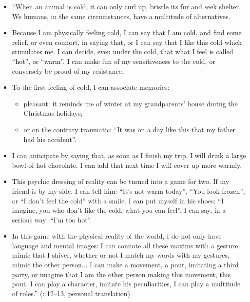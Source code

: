 \documentclass[output=paper]{langscibook}
\begin{document}
\begin{itemize}
\item “When an animal is cold, it can only curl up, bristle its fur and seek shelter. We humans, in the same circumstances, have a multitude of alternatives.
\item Because I am physically feeling cold, I can say that I am cold, and find some relief, or even comfort, in saying that, or I can say that I like this cold which stimulates me. I can decide, even under the cold, that what I feel is called “hot”, or “warm”. I can make fun of my sensitiveness to the cold, or conversely be proud of my resistance.
\item To the first feeling of cold, I can associate memories:

\begin{itemize}
\item pleasant: it reminds me of winter at my grandparents' house during the Christmas holidays;
\item or on the contrary traumatic: “It was on a day like this that my father had his accident”.
\end{itemize}

\item I can anticipate by saying that, as soon as I finish my trip, I will drink a large bowl of hot chocolate. I can add that next time I will cover up more warmly. 

\item This psychic dressing of reality can be turned into a game for two. If my friend is by my side, I can tell him: “It's not warm today”, “You look frozen”, or “I don't feel the cold” with a smile. I can put myself in his shoes: “I imagine, you who don't like the cold, what you can feel”. I can say, in a serious way: “I'm too hot”.

\item In this game with the physical reality of the world, I do not only have language and mental images: I can connote all these maxims with a gesture, mimic that I shiver, whether or not I match my words with my gestures, mimic the other person... I can make a movement, a pout, imitating a third party, or imagine that I am the other person making this movement, this pout. I can play a character, imitate his peculiarities, I can play a multitude of roles.” (\citealt{Jouvent2013}: 12--13, personal translation)
\end{itemize}
\end{document}
